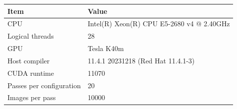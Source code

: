 \begin{tabular}{ll}
\toprule
Item & Value \\
\midrule
CPU & Intel(R) Xeon(R) CPU E5-2680 v4 @ 2.40GHz \\
Logical threads & 28 \\
GPU & Tesla K40m \\
Host compiler & 11.4.1 20231218 (Red Hat 11.4.1-3) \\
CUDA runtime & 11070 \\
Passes per configuration & 20 \\
Images per pass & 10000 \\
\bottomrule
\end{tabular}
